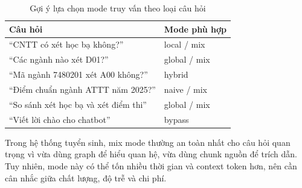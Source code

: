 \begin{table}[H]
\centering
\begin{tabular}{|p{6cm}|p{6.8cm}|}
\hline
\textbf{Câu hỏi} & \textbf{Mode phù hợp} \\
\hline
``CNTT có xét học bạ không?'' & local / mix \\
\hline
``Các ngành nào xét D01?'' & global / mix \\
\hline
``Mã ngành 7480201 xét A00 không?'' & hybrid \\
\hline
``Điểm chuẩn ngành ATTT năm 2025?'' & naive / mix \\
\hline
``So sánh xét học bạ và xét điểm thi'' & global / mix \\
\hline
``Viết lời chào cho chatbot'' & bypass \\
\hline
\end{tabular}
\caption{Gợi ý lựa chọn mode truy vấn theo loại câu hỏi}
\label{tab:rag-mode-selection}
\end{table}

Trong hệ thống tuyển sinh, mix mode thường an toàn nhất cho câu hỏi quan trọng vì vừa dùng graph để hiểu quan hệ, vừa dùng chunk nguồn để trích dẫn. Tuy nhiên, mode này có thể tốn nhiều thời gian và context token hơn, nên cần cân nhắc giữa chất lượng, độ trễ và chi phí.

